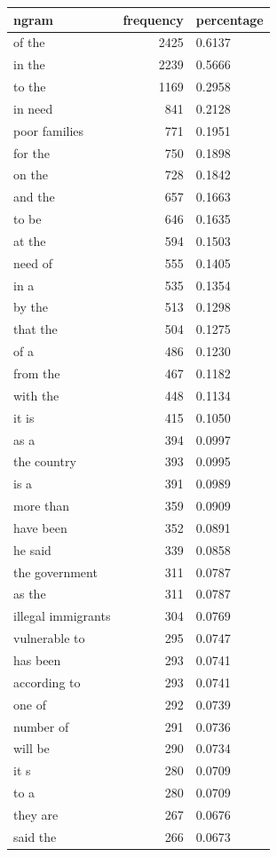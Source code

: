 \begin{tabular}{lrl}
\toprule
ngram & frequency & percentage \\
\midrule
of the & 2425 & 0.6137 \\
in the & 2239 & 0.5666 \\
to the & 1169 & 0.2958 \\
in need & 841 & 0.2128 \\
poor families & 771 & 0.1951 \\
for the & 750 & 0.1898 \\
on the & 728 & 0.1842 \\
and the & 657 & 0.1663 \\
to be & 646 & 0.1635 \\
at the & 594 & 0.1503 \\
need of & 555 & 0.1405 \\
in a & 535 & 0.1354 \\
by the & 513 & 0.1298 \\
that the & 504 & 0.1275 \\
of a & 486 & 0.1230 \\
from the & 467 & 0.1182 \\
with the & 448 & 0.1134 \\
it is & 415 & 0.1050 \\
as a & 394 & 0.0997 \\
the country & 393 & 0.0995 \\
is a & 391 & 0.0989 \\
more than & 359 & 0.0909 \\
have been & 352 & 0.0891 \\
he said & 339 & 0.0858 \\
the government & 311 & 0.0787 \\
as the & 311 & 0.0787 \\
illegal immigrants & 304 & 0.0769 \\
vulnerable to & 295 & 0.0747 \\
has been & 293 & 0.0741 \\
according to & 293 & 0.0741 \\
one of & 292 & 0.0739 \\
number of & 291 & 0.0736 \\
will be & 290 & 0.0734 \\
it s & 280 & 0.0709 \\
to a & 280 & 0.0709 \\
they are & 267 & 0.0676 \\
said the & 266 & 0.0673 \\

\end{tabular}
